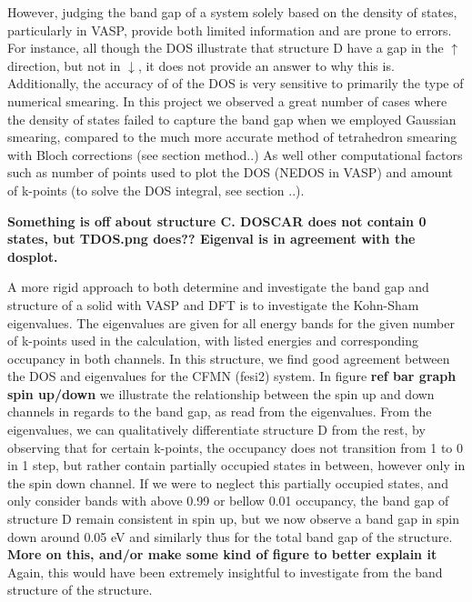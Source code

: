 However, judging the band gap of a system solely based on the density of states, particularly in VASP, provide both limited information and are prone to errors. For instance, all though the DOS illustrate that structure D have a gap in the $\uparrow$ direction, but not in $\downarrow$, it does not provide an answer to why this is. Additionally, the accuracy of of the DOS is very sensitive to primarily the type of numerical smearing. In this project we observed a great number of cases where the density of states failed to capture the band gap when we employed Gaussian smearing, compared to the much more accurate method of tetrahedron smearing with Bloch corrections (see section method..)  As well other computational factors such as number of points used to plot the DOS (NEDOS in VASP) and amount of k-points (to solve the DOS integral, see section ..). 

\textbf{Something is off about structure C. DOSCAR does not contain 0 states, but TDOS.png does?? Eigenval is in agreement with the dosplot.}

A more rigid approach to both determine and investigate the band gap and structure of a solid with VASP and DFT is to investigate the Kohn-Sham eigenvalues. The eigenvalues are given for all energy bands for the given number of k-points used in the calculation, with listed energies and corresponding occupancy in both channels. In this structure, we find good agreement between the DOS and eigenvalues for the CFMN (fesi2) system. In figure \textbf{ref bar graph spin up/down} we illustrate the relationship between the spin up and down channels in regards to the band gap, as read from the eigenvalues. From the eigenvalues, we can qualitatively differentiate structure D from the rest, by observing that for certain k-points, the occupancy does not transition from 1 to 0 in 1 step, but rather contain partially occupied states in between, however only in the spin down channel. If we were to neglect this partially occupied states, and only consider bands with above 0.99 or bellow 0.01 occupancy, the band gap of structure D remain consistent in spin up, but we now observe a band gap in spin down around 0.05 eV and similarly thus for the total band gap of the structure. \textbf{More on this, and/or make some kind of figure to better explain it}
Again, this would have been extremely insightful to investigate from the band structure of the structure.

